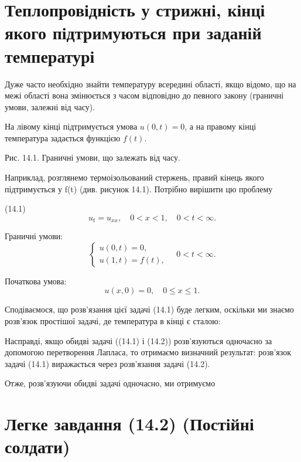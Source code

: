 \section{Теплопровідність у стрижні, кінці якого підтримуються при заданій температурі}\label{ux442ux435ux43fux43bux43eux43fux440ux43eux432ux456ux434ux43dux456ux441ux442ux44c-ux443-ux441ux442ux440ux438ux436ux43dux456-ux43aux456ux43dux446ux456-ux44fux43aux43eux433ux43e-ux43fux456ux434ux442ux440ux438ux43cux443ux44eux442ux44cux441ux44f-ux43fux440ux438-ux437ux430ux434ux430ux43dux456ux439-ux442ux435ux43cux43fux435ux440ux430ux442ux443ux440ux456}

Дуже часто необхідно знайти температуру всередині області, якщо відомо, що на межі області вона змінюється з часом відповідно до певного закону (граничні умови, залежні від часу).

На лівому кінці підтримується умова \(u(0,t)=0\), а на правому кінці температура задається функцією \(f(t)\).

Рис. 14.1. Граничні умови, що залежать від часу.

Наприклад, розглянемо термоізольований стержень, правий кінець якого підтримується у f(t) (див. рисунок 14.1). Потрібно вирішити цю проблему

(14.1) \[
u_t = u_{xx}, \quad 0 < x < 1, \quad 0 < t < \infty.
\]

Граничні умови: \[
\begin{cases}
u(0, t) = 0, \\
u(1, t) = f(t),
\end{cases}
\quad 0 < t < \infty.
\]

Початкова умова: \[
u(x, 0) = 0, \quad 0 \le x \le 1.
\]

Сподіваємося, що розв'язання цієї задачі (14.1) буде легким, оскільки ми знаємо розв'язок простішої задачі, де температура в кінці є сталою:

Насправді, якщо обидві задачі ((14.1) і (14.2)) розв'язуються одночасно за допомогою перетворення Лапласа, то отримаємо визначний результат: розв'язок задачі (14.1) виражається через розв'язання задачі (14.2).

Отже, розв'язуючи обидві задачі одночасно, ми отримуємо

\section{Легке завдання (14.2) (Постійні солдати)}\label{ux43bux435ux433ux43aux435-ux437ux430ux432ux434ux430ux43dux43dux44f-14.2-ux43fux43eux441ux442ux456ux439ux43dux456-ux441ux43eux43bux434ux430ux442ux438}

